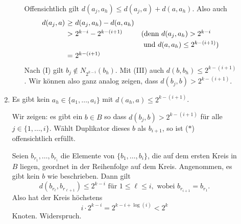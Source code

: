 \documentclass[fontsize=11pt, twoside=false, numbers=autoenddot]{scrbook}
\begin{document}
\begin{beweis}
\begin{description}
\begin{enumerate}
\begin{enumerate}
            Offensichtlich gilt $d(a_j,a_h) \leq d(a_j,a) + d(a,a_h)$.
            Also auch 
            \[
              \begin{array}{r@{~}c@{~}ll}
                d(a_j,a) & \geq & d(a_j,a_h) - d(a,a_h) \\[1mm]
                         & >    & 2^{k-i} - 2^{k-(i+1)} & \text{(denn $d(a_j,a_h) > 2^{k-i}$} \\[1mm]
                         &      &                       & \text{~und $d(a,a_h) \leq 2^{k-(i+1)}$)} \\[1mm]
                         & =    & 2^{k-(i+1)}
              \end{array}
            \]
            Nach
            (I) gilt $b_j \notin N_{2^{k-i}}(b_h)$. Mit (III) auch $d(b,b_h) \leq 2^{k-(i+1)}$.
            Wir k\"onnen also ganz analog zeigen, dass $d(b_j,b) > 2^{k-(i+1)}$.
        \end{enumerate}

      \item
        Es gibt kein $a_h \in \{a_1,\dots,a_i\}$ mit $d(a_h,a) \leq 2^{k-(i+1)}$. 

        Wir zeigen: es gibt ein $b \in B$ so dass $d(b_j,b) >
        2^{k-(i+1)}$ f\"ur alle $j \in \{1,\dots,i\}$. W\"ahlt Duplikator dieses $b$ als $b_{i+1}$,
        so ist ($*$) offensichtlich erf\"ullt.

        Seien $b_{r_1},\dots,b_{r_i}$ die Elemente von $\{b_1,\dots,b_i\}$,
        die auf dem ersten Kreis in $B$ liegen, geordnet in der Reihenfolge
        auf dem Kreis.  Angenommen, es gibt kein $b$ wie beschrieben. Dann gilt
        \[
          d(b_{r_\ell},b_{r_{\ell+1}}) \leq 2^{k-i} \text{ f\"ur } 1 \leq \ell \leq i, \text{ wobei }
          b_{r_{i+1}}=b_{r_1}.
        \]
        Also hat der Kreis h\"ochstens
        \[
          i \cdot  2^{k-i} = 2^{k-i+\log(i)} < 2^k
        \]
        Knoten. Widerspruch.
        \qedhere
      \end{enumerate}
  \end{description}
\end{beweis}%
\end{document}
